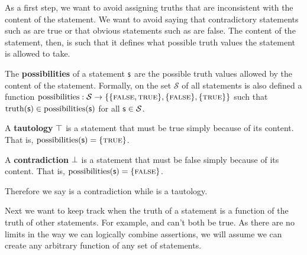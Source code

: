 \documentclass[11pt,letterpaper,fleqn]{memoir} %
\begin{document}
As a first step, we want to avoid assigning truths that are inconsistent with the content of the statement.  We want to avoid saying that contradictory statements such as  are true or that obvious statements such as  are false. The content of the statement, then, is such that it defines what possible truth values the statement is allowed to take.

\begin{mathSection}
	
	\begin{defn}\label{def_possibilities}
		The \textbf{possibilities} of a statement $\mathsf{s}$ are the possible truth values allowed by the content of the statement. Formally, on the set $\mathcal{S}$ of all statements is also defined a function $\operatorname{possibilities}: \mathcal{S} \to \{\{\textsc{false}, \textsc{true}\},\{\textsc{false}\},\{\textsc{true}\}\}$ such that $\operatorname{truth}(\mathsf{s}) \in \operatorname{possibilities}(\mathsf{s})$ for all $\mathsf{s} \in \mathcal{S}$.
	\end{defn}
	
	\begin{defn}
		A \textbf{tautology} $\top$ is a statement that must be true simply because of its content. That is, $\operatorname{possibilities}(\mathsf{s}) = \{\textsc{true}\}$.
	\end{defn}
	
	\begin{defn}
		A \textbf{contradiction} $\bot$ is a statement that must be false simply because of its content. That is, $\operatorname{possibilities}(\mathsf{s}) = \{\textsc{false}\}$.
	\end{defn}
	
\end{mathSection}

Therefore we say  is a contradiction while  is a tautology.

Next we want to keep track when the truth of a statement is a function of the truth of other statements. For example,  and  can't both be true. As there are no limits in the way we can logically combine assertions, we will assume we can create any arbitrary function of any set of statements.
\end{document}
